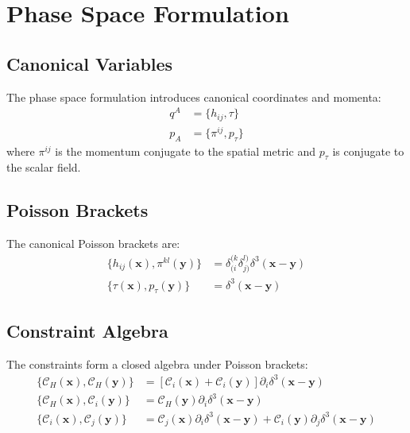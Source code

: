 \documentclass[11pt,a4paper]{article}
\theoremstyle{definition}
\theoremstyle{remark}
\newcommand{\constraint}{\mathcal{C}}
\newcommand{\Poisson}[2]{\{#1, #2\}}
\begin{document}
\section{Phase Space Formulation}

\subsection{Canonical Variables}

The phase space formulation introduces canonical coordinates and momenta:
\begin{align}
q^A &= \{h_{ij}, \tau\} \\
p_A &= \{\pi^{ij}, p_\tau\}
\end{align}
where $\pi^{ij}$ is the momentum conjugate to the spatial metric and $p_\tau$ is conjugate to the scalar field.

\subsection{Poisson Brackets}

The canonical Poisson brackets are:
\begin{align}
\Poisson{h_{ij}(\mathbf{x})}{\pi^{kl}(\mathbf{y})} &= \delta^{(k}_{(i} \delta^{l)}_{j)} \delta^3(\mathbf{x} - \mathbf{y}) \\
\Poisson{\tau(\mathbf{x})}{p_\tau(\mathbf{y})} &= \delta^3(\mathbf{x} - \mathbf{y})
\end{align}

\subsection{Constraint Algebra}

The constraints form a closed algebra under Poisson brackets:
\begin{align}
\Poisson{\constraint_H(\mathbf{x})}{\constraint_H(\mathbf{y})} &= [\constraint_i(\mathbf{x}) + \constraint_i(\mathbf{y})] \partial_i \delta^3(\mathbf{x} - \mathbf{y}) \\
\Poisson{\constraint_H(\mathbf{x})}{\constraint_i(\mathbf{y})} &= \constraint_H(\mathbf{y}) \partial_i \delta^3(\mathbf{x} - \mathbf{y}) \\
\Poisson{\constraint_i(\mathbf{x})}{\constraint_j(\mathbf{y})} &= \constraint_j(\mathbf{x}) \partial_i \delta^3(\mathbf{x} - \mathbf{y}) + \constraint_i(\mathbf{y}) \partial_j \delta^3(\mathbf{x} - \mathbf{y})
\end{align}
\end{document}
